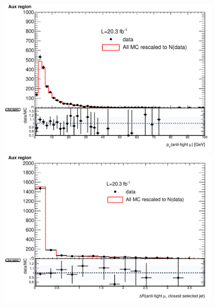 \begin{figure}[!htbp]
  \begin{minipage}[h]{0.5\textwidth}
    \centering \includegraphics[width=\textwidth]{figs/fake/h_muPt_CR_early_AF2_extrap_MET50_noIso_RESCALED}
  \end{minipage}\hfill
  \begin{minipage}[h]{0.5\textwidth}
    \centering \includegraphics[width=\textwidth]{figs/fake/h_minDRjet_CR_early_AF2_extrap_MET50_noIso_RESCALED}
  \end{minipage}\hfill
  \begin{minipage}[h]{0.5\textwidth}

\end{minipage}
\end{figure}
